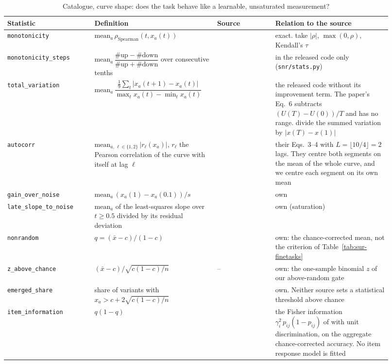 \begin{table}[h]
\centering
\scriptsize
\begin{tabular}{@{}p{0.215\linewidth}p{0.28\linewidth}p{0.14\linewidth}p{0.285\linewidth}@{}}
\toprule
\textbf{Statistic} & \textbf{Definition} & \textbf{Source} & \textbf{Relation to the source} \\
\midrule
\texttt{monotonicity} & $\mathrm{mean}_a\,\rho_{\text{Spearman}}(t, x_a(t))$ & \citet{kydlicek_finetasks_nodate} & exact. \citet{hofmann_fluid_2025} take $|\rho|$, \citet{yagoubi_e2lm_2025} $\max(0, \rho)$, \citet{madaan_quantifying_2024} Kendall's $\tau$ \\
\texttt{monotonicity\_steps} & $\mathrm{mean}_a\,\dfrac{\#\text{up} - \#\text{down}}{\#\text{up} + \#\text{down}}$ over consecutive tenths & \citet{heineman_signal_2025} & in the released code only (\texttt{snr/stats.py}) \\
\texttt{total\_variation} & $\mathrm{mean}_a\,\dfrac{\frac{1}{9}\sum_{t}|x_a(t{+}1) - x_a(t)|}{\max_t x_a(t) - \min_t x_a(t)}$ & \citet{heineman_signal_2025, hofmann_fluid_2025} & the released code without its improvement term. The paper's Eq.~6 subtracts $(U(T) - U(0))/T$ and has no range. \citet{hofmann_fluid_2025} divide the summed variation by $|x(T) - x(1)|$ \\
\texttt{autocorr} & $\mathrm{mean}_{a,\,\ell \in \{1,2\}}\,|r_\ell(x_a)|$, $r_\ell$ the Pearson correlation of the curve with itself at lag $\ell$ & \citet{yagoubi_e2lm_2025} & their Eqs.~3--4 with $L = \lfloor 10/4 \rfloor = 2$ lags. They centre both segments on the mean of the whole curve, and we centre each segment on its own mean \\
\texttt{gain\_over\_noise} & $\mathrm{mean}_a\,(x_a(1) - x_a(0.1))/s$ & \citet{madaan_quantifying_2024} & own \\
\texttt{late\_slope\_to\_noise} & $\mathrm{mean}_a$ of the least-squares slope over $t \geq 0.5$ divided by its residual deviation & \citet{hofmann_fluid_2025} & own (saturation) \\
\texttt{nonrandom} & $q = (\bar{x} - c)/(1 - c)$ & \citet{kydlicek_finetasks_nodate} & own: the chance-corrected mean, not the criterion of Table~\ref{tab:sur-finetasks} \\
\texttt{z\_above\_chance} & $(\bar{x} - c)/\sqrt{c(1-c)/n}$ & -- & own: the one-sample binomial $z$ of our above-random gate \\
\texttt{emerged\_share} & share of variants with $x_a > c + 2\sqrt{c(1-c)/n}$ & \citet{du_understanding_2024, schaeffer_are_2023} & own. Neither source sets a statistical threshold above chance \\
\texttt{item\_information} & $q(1 - q)$ & \citet{rodriguez_evaluation_2021, vania_comparing_2021} & the Fisher information $\gamma_i^2\,p_{ij}(1 - p_{ij})$ of \citet{rodriguez_evaluation_2021} with unit discrimination, on the aggregate chance-corrected accuracy. No item response model is fitted \\
\bottomrule
\end{tabular}
\caption{Catalogue, curve shape: does the task behave like a learnable, unsaturated measurement?}
\label{tab:sur-shape}
\end{table}

